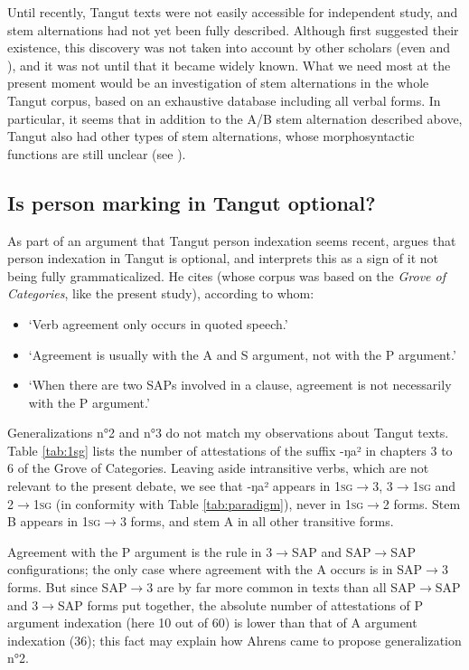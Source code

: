 \documentclass[oldfontcommands,oneside,a4paper,11pt]{article}
\newcommand{\ipa}[1]{{\phon \mbox{#1}}} %
\begin{document}
Until recently, Tangut texts were not easily accessible for independent study, and stem alternations had not yet been fully described. Although \citet{nishida75} first suggested their existence, this discovery was not taken into account by other scholars (even \citealt{kepping85} and \citealt{driem91tangut}), and it was not until \citet{gong01huying} that it became widely known. What we need most at the present moment would be an investigation of stem alternations in the whole Tangut corpus, based on an exhaustive database including all verbal forms. In particular, it seems that in addition to the A/B stem alternation described above, Tangut also had other types of stem alternations, whose morphosyntactic functions are still unclear (see \citealt{jacques14esquisse}).

\subsection{Is person marking in Tangut optional?} \label{sec:optional}
As part of an argument that Tangut person indexation seems recent, \citet{lapolla92} argues that person indexation in Tangut is optional, and interprets this as a sign of it not being fully grammaticalized. He cites \citet{ahrens90tangut} (whose corpus was based on the \textit{Grove of Categories}, like the present study), according to whom:

\begin{itemize}
\item `Verb agreement only occurs in quoted speech.'
\item `Agreement is usually with the A and S argument, not with the P argument.'
\item `When there are two SAPs involved in a clause, agreement is not necessarily with the P argument.'
\end{itemize}

Generalizations n°2 and n°3 do not match my observations about Tangut texts. Table \ref{tab:1sg} lists the number of attestations of the suffix  \ipa{-ŋa²} in chapters 3 to 6 of the Grove of Categories.  Leaving aside intransitive verbs, which are not relevant to the present debate, we see that \ipa{-ŋa²} appears in \textsc{1sg}$\rightarrow$3, 3$\rightarrow$\textsc{1sg} and 2$\rightarrow$\textsc{1sg} (in conformity with Table \ref{tab:paradigm}), never in \textsc{1sg}$\rightarrow$2 forms. Stem B appears in \textsc{1sg}$\rightarrow$3 forms, and stem A in all other transitive forms. 

Agreement with the P argument is the rule in 3$\rightarrow$SAP and SAP$\rightarrow$SAP configurations; the only case where agreement with the A occurs is in SAP$\rightarrow$3 forms. But since SAP$\rightarrow$3 are by far more common in texts than all SAP$\rightarrow$SAP and 3$\rightarrow$SAP forms put together, the absolute number of attestations of P argument indexation (here 10 out of 60) is lower than that of A argument indexation (36); this fact may explain how Ahrens came to propose generalization n°2.
\end{document}
